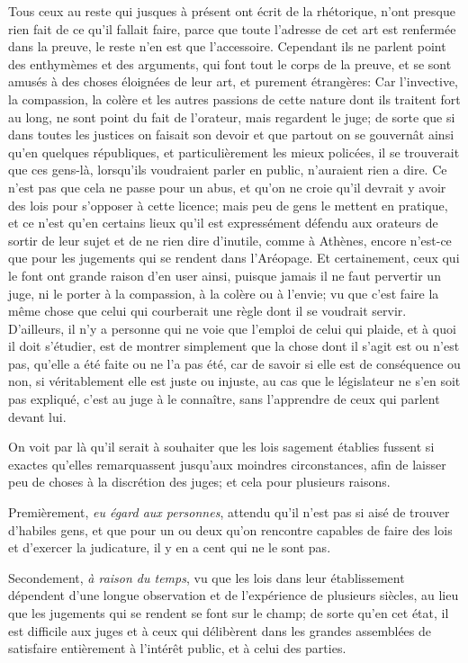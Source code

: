Tous ceux au reste qui jusques à présent ont écrit de la rhétorique, n'ont presque rien fait de ce qu'il fallait faire, parce que
toute l'adresse de cet art est renfermée dans la preuve, le reste n'en est que l'accessoire. Cependant ils ne  parlent point des
enthymèmes et des arguments, qui font tout le corps de la preuve, et se sont amusés à des choses éloignées de leur art, et purement
étrangères: Car l'invective, la compassion, la colère et les autres passions de cette nature dont ils traitent fort au long, ne
sont point du fait de l'orateur, mais regardent le juge; de sorte que si dans toutes les justices on faisait son devoir et que
partout on se gouvernât ainsi qu'en quelques républiques, et particulièrement les mieux policées, il se trouverait que ces gens-là,
lorsqu'ils voudraient parler en public, n'auraient rien a dire. Ce n'est pas que cela ne passe pour un abus, et qu'on ne croie
qu'il devrait y avoir des lois pour s'opposer à cette licence; mais peu de gens le mettent en pratique, et ce n'est qu'en certains
lieux qu'il est expressément défendu aux orateurs de sortir de leur sujet et de ne rien dire d'inutile, comme à Athènes, encore
n'est-ce que pour les jugements qui se rendent dans l'Aréopage. Et certainement, ceux qui le font ont grande raison d'en user ainsi,
puisque jamais il ne faut pervertir un juge, ni le porter à la compassion, à la colère ou à l'envie; vu que c'est faire la même
chose que  celui qui courberait une règle dont il se voudrait servir. D'ailleurs, il n'y a personne qui ne voie que l'emploi de celui
qui plaide, et à quoi il doit s'étudier, est de montrer simplement que la chose dont il s'agit est ou n'est pas, qu'elle a été faite ou
ne l'a pas été, car de savoir si elle  est de conséquence ou non, si véritablement elle est juste ou injuste, au cas que le législateur
ne s'en soit pas expliqué, c'est au juge à le connaître, sans l'apprendre de ceux qui parlent devant lui. 

\bigbreak

On voit par là qu'il serait à souhaiter que les lois sagement établies fussent si exactes qu'elles remarquassent jusqu'aux moindres
circonstances, afin de laisser peu de choses à la discrétion des juges; et cela pour plusieurs raisons.

Premièrement, \emph{eu égard aux personnes}, attendu qu'il n'est pas si aisé de trouver d'habiles gens, et que pour un ou deux qu'on
rencontre capables de faire des lois et d'exercer la judicature, il y  en a cent qui ne le sont pas.

Secondement, \emph{à raison du temps}, vu que les lois dans leur établissement dépendent d'une longue observation et de l'expérience de
plusieurs siècles, au lieu que les jugements qui se rendent se font sur le champ; de sorte qu'en cet état, il est difficile aux juges et
à ceux qui délibèrent dans les grandes assemblées de satisfaire  entièrement à l'intérêt public, et à celui des parties.

